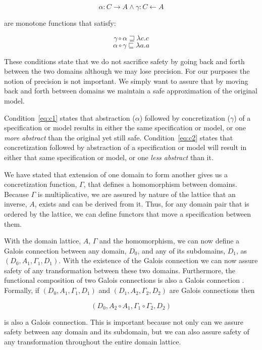 \documentclass[12pt]{article}
\begin{document}
\[\alpha:C \rightarrow A \wedge \gamma:C \leftarrow A\]

\noindent are monotone functions that satisfy:

\begin{equation}
\label{eq:c1}
\gamma \circ \alpha \sqsupseteq \lambda c.c
\end{equation}
\begin{equation}
\label{eq:c2}
\alpha \circ \gamma \sqsubseteq \lambda a.a
\end{equation}

\noindent These conditions state that we do not sacrifice safety by going back and forth
between the two domains although we may lose precision.  For our purposes the notion of
precision is not important.  We simply want to assure that by moving back and forth
between domains we maintain a safe approximation of the original model.

Condition~\ref{eq:c1} states that abstraction ($\alpha$) followed by concretization
($\gamma$) of a specification or model results in either the same specification or model,
or one \emph{more abstract} than the original yet still safe.  Condition~\ref{eq:c2}
states that concretization followed by abstraction of a specification or model will result
in either that same specification or model, or one \emph{less abstract} than it.

We have stated that extension of one domain to form another gives us a concretization
function, $\Gamma$, that defines a homomorphism between domains.  Because $\Gamma$ is
multiplicative, we are assured by nature of the lattice that an inverse, $A$, exists and
can be derived from it.  Thus, for any domain pair that is ordered by the lattice, we can
define functors that move a specification between them.

With the domain lattice, $A$, $\Gamma$ and the homomorphism, we can now define a Galois
connection between any domain, $D_0$, and any of its subdomains, $D_1$, as
$(D_0,A_1,\Gamma_1,D_1)$.  With the existence of the Galois connection we can now assure
safety of any transformation between these two domains.  Furthermore, the functional
composition of two Galois connections is also a Galois connection
\cite{Nielson:05:Principles-of-P}. Formally, if $(D_0, A_1, \Gamma_1, D_1)$ and $(D_1,
A_2, \Gamma_2,D_2)$ are Galois connections then

\[(D_0, A_2 \circ A_1, \Gamma_1 \circ \Gamma_2, D_2)\]

\noindent is also a Galois connection.  This is important because not only can we assure
safety between any domain and its subdomain, but we can also assure safety of any
transformation throughout the entire domain lattice.
\end{document}
